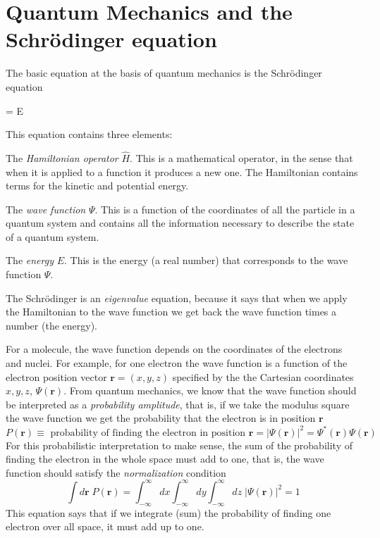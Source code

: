\documentclass[../Main/chem371-notes.tex]{subfiles}
\begin{document}
\section{Quantum Mechanics and the Schr\"{o}dinger equation}
The basic equation at the basis of quantum mechanics is the Schr\"{o}dinger equation
\begin{iequation}
\Psi = E \Psi
\end{iequation}
This equation contains three elements:
\begin{myitems}
\item The \emph{Hamiltonian operator} $\hat{H}$. This is a mathematical operator, in the sense that when it is applied to a function it produces a new one. The Hamiltonian contains terms for the kinetic and potential energy.
\item The \emph{wave function} $\Psi$. This is a function of the coordinates of all the particle in a quantum system and contains all the information necessary to describe the state of a quantum system.
\item The \emph{energy} $E$. This is the energy (a real number) that corresponds to the wave function $\Psi$.
\end{myitems}
The Schr\"{o}dinger is an \emph{eigenvalue} equation, because it says that when we apply the Hamiltonian to the wave function we get back the wave function times a number (the energy).

For a molecule, the wave function depends on the coordinates of the electrons and nuclei.
For example, for one electron the wave function is a function of the electron position vector $\mathbf{r} = (x,y,z)$ specified by the the Cartesian coordinates $x,y,z$, $\Psi(\mathbf{r})$.
From quantum mechanics, we know that the wave function should be interpreted as a \emph{probability amplitude}, that is, if we take the modulus square the wave function we get the probability that the electron is in position $\mathbf{r}$
\begin{equation}
P(\mathbf{r}) \equiv \text{ probability of finding the electron in position } \mathbf{r} = |\Psi(\mathbf{r})|^2  = \Psi^*(\mathbf{r}) \Psi(\mathbf{r}) 
\end{equation}
For this probabilistic interpretation to make sense, the sum of the probability of finding the electron in the whole space must add to one, that is, the wave function should satisfy the \emph{normalization} condition
\begin{equation}
\int  d\mathbf{r} \; P(\mathbf{r}) =  \int _{-\infty}^{\infty} dx \int _{-\infty}^{\infty} dy \int _{-\infty}^{\infty} dz \; |\Psi(\mathbf{r})|^2   = 1
\end{equation}
This equation says that if we integrate (sum) the probability of finding one electron over all space, it must add up to one.
\end{document}
